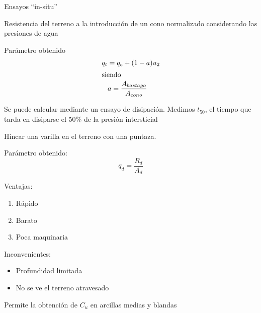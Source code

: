 \begin{mybox}{Ensayos ``in-situ''}
	
	\begin{ldef}[CPT]
		Resistencia del terreno a la introducción de un cono normalizado considerando las presiones de agua
	\end{ldef}
	Parámetro obtenido
	\begin{gather}\label{eq:2.1}
      q_t = q_c + (1-a)u_2 \\
      \shortintertext{siendo}
      \begin{aligned}
        &a = \frac{A_{bastago}}{A_{cono}}
      \end{aligned}\notag
    \end{gather}

    \begin{myrem}
    	Se puede calcular mediante un ensayo de disipación. Medimos $t_{50}$, el tiempo que tarda en disiparse el 50\% de la presión intersticial
    \end{myrem}

    \begin{ldef}
    	Hincar una varilla en el terreno con una puntaza.
    \end{ldef}
    Parámetro obtenido:
    \[
    	q_d = \frac{R_d}{A_d}
    \]
    \begin{minipage}[t]{0.5\textwidth}
	Ventajas:
	\begin{enumerate}
		\item Rápido
		\item Barato
		\item Poca maquinaria
	\end{enumerate}
	\end{minipage}%
	\begin{minipage}[t]{0.5\textwidth}
	Inconvenientes:
		\begin{itemize}
			\item Profundidad limitada
			\item No se ve el terreno atravesado
		\end{itemize}
	\end{minipage}

	Permite la obtención de $C_u$ en arcillas medias y blandas


\end{mybox}
